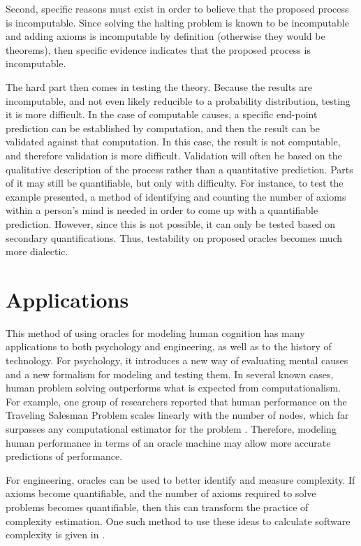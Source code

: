 Second, specific reasons must exist in order to believe that the proposed process is incomputable.  Since solving the halting problem is known to be incomputable and adding axioms is incomputable by definition (otherwise they would be theorems), then specific evidence indicates that the proposed process is incomputable.  

The hard part then comes in testing the theory.  Because the results are incomputable, and not even likely reducible to a probability distribution, testing it is more difficult.  In the case of computable causes, a specific end-point prediction can be established by computation, and then the result can be validated against that computation.  In this case, the result is not computable, and therefore validation is more difficult.  Validation will often be based on the qualitative description of the process rather than a quantitative prediction.  Parts of it may still be quantifiable, but only with difficulty.  For instance, to test the example presented, a method of identifying and counting the number of axioms within a person's mind is needed in order to come up with a quantifiable prediction.  However, since this is not possible, it can only be tested based on secondary quantifications.  Thus, testability on proposed oracles becomes much more dialectic.

\section{Applications}

This method of using oracles for modeling human cognition has many applications to both psychology and engineering, as well as to the history of technology.  For psychology, it introduces a new way of evaluating mental causes and a new formalism for modeling and testing them.  In several known cases, human problem solving outperforms what is expected from computationalism.  For example, one group of researchers
reported that human performance on the Traveling Salesman Problem scales linearly with the number of nodes, which far surpasses any computational estimator for the problem .  Therefore, modeling human performance in terms of an oracle machine may allow more accurate predictions of performance.

For engineering, oracles can be used to better identify and measure complexity.  If axioms become quantifiable, and the number of axioms required to solve problems becomes quantifiable, then this can transform the practice of complexity estimation.  One such method to use these ideas to calculate software complexity is given in \citet{bartlett2012}.  

